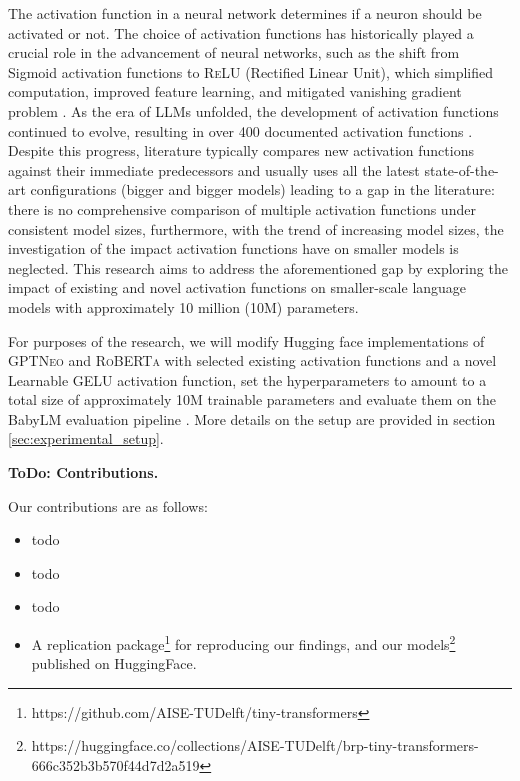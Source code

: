 The activation function in a neural network determines if a neuron should be activated or not. The choice of activation functions has historically played a crucial role in the advancement of neural networks, such as the shift from Sigmoid activation functions to \textsc{ReLU} (Rectified Linear Unit), which simplified computation, improved feature learning, and mitigated vanishing gradient problem \cite{nair2010rectified}. As the era of LLMs unfolded, the development of activation functions continued to evolve, resulting in over 400 documented activation functions \cite{Kunc2024}. Despite this progress, literature typically compares new activation functions against their immediate predecessors and usually uses all the latest state-of-the-art configurations (bigger and bigger models) leading to a gap in the literature: there is no comprehensive comparison of multiple activation functions under consistent model sizes, furthermore, with the trend of increasing model sizes, the investigation of the impact activation functions have on smaller models is neglected. This research aims to address the aforementioned gap by exploring the impact of existing and novel activation functions on smaller-scale language models with approximately 10 million (10M) parameters. 

For purposes of the research, we will modify Hugging face implementations of \textsc{GPTNeo} \cite{huggingfaceNEO} and \textsc{RoBERTa} \cite{huggingfaceRoberta} with selected existing activation functions and a novel Learnable GELU activation function, set the hyperparameters to amount to a total size of approximately 10M trainable parameters and evaluate them on the BabyLM evaluation pipeline \cite{Warstadt2023}. More details on the setup are provided in section \ref{sec:experimental_setup}.

\textbf{ToDo: Contributions.}

\noindent Our contributions are as follows:

\begin{itemize}

    \item todo 
    \item todo 
    \item todo 
    \item A replication package\footnote{https://github.com/AISE-TUDelft/tiny-transformers} for reproducing our findings, and our models\footnote{https://huggingface.co/collections/AISE-TUDelft/brp-tiny-transformers-666c352b3b570f44d7d2a519} published on HuggingFace.

\end{itemize}
